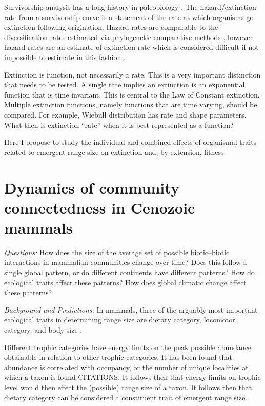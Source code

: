 \documentclass[12pt,letterpaper]{article}
\begin{document}
Survivorship analysis has a long history in paleobiology \citep{Simpson1944,VanValen1979,Foote1988,Baumiller1993,Kitchell1987b,Kitchell1990,Simpson1953,Raup1991a,Simpson2006}. The hazard/extinction rate from a survivorship curve is a statement of the rate at which organisms go extinction following origination. Hazard rates are comparable to the diversification rates estimated via phylogenetic comparative methods \citep{Fitzjohn2010,Maddison2007,Rabosky2013,Nee2001,Nee1994d,Nee1992}, however hazard rates are an estimate of extinction rate which is considered difficult if not impossible to estimate in this fashion \citep{Rabosky2010a}.

Extinction is function, not necessarily a rate. This is a very important distinction that needs to be tested. A single rate implies an extinction is an exponential function that is time invariant. This is central to the Law of Constant extinction. Multiple extinction functions, namely functions that are time varying, should be compared. For example, Wiebull distribution has rate and shape parameters. What then is extinction ``rate'' when it is best represented as a function?

Here I propose to study the individual and combined effects of organismal traits related to emergent range size on extinction and, by extension, fitness.


\section{Dynamics of community connectedness in Cenozoic mammals}

\textit{Questions:} 
How does the size of the average set of possible biotic--biotic interactions in mammalian communities change over time? Does this follow a single global pattern, or do different continents have different patterns? How do ecological traits affect these patterns? How does global climatic change affect these patterns?

\textit{Background and Predictions:}
In mammals, three of the arguably most important ecological traits in determining range size are dietary category, locomotor category, and body size \citep{Jernvall2004,Smith2008b,Smith2004,Lyons2005,Lyons2010}.

Different trophic categories have energy limits on the peak possible abundance obtainable in relation to other trophic categories. It has been found that abundance is correlated with occupancy, or the number of unique localities at which a taxon is found CITATIONS. It follows then that energy limits on trophic level would then effect the (possible) range size of a taxon. It follows then that dietary category can be considered a constituent trait of emergent range size. 
\end{document}
